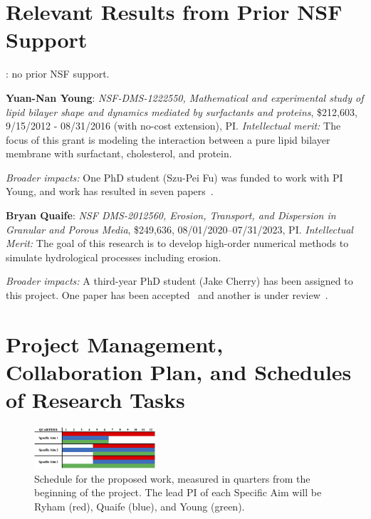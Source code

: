 \section{Relevant Results from Prior NSF Support}
\label{sec:prior}
: no prior NSF support.

\noindent
{\bf Yuan-Nan Young}: {\em NSF-DMS-1222550, Mathematical and
experimental study of lipid bilayer shape and dynamics mediated by
surfactants and proteins}, \$212,603, 9/15/2012 - 08/31/2016 (with
no-cost extension), PI. {\em Intellectual merit:} The focus of this
grant is modeling the interaction between a pure lipid bilayer membrane
with surfactant, cholesterol, and protein.

\noindent
{\em Broader impacts:} 
One PhD student (Szu-Pei Fu) was funded to work with PI Young, and work
has resulted in seven papers~\cite{Nganguia2013_PoF, Nganguia2013_PRE,
Young2014_JFM, Young2015_PoF, Nganguia2015_CiCP, Pak2015_PNAS,
fu2015pre}. 

\noindent
{\bf Bryan Quaife}: {\em NSF DMS-2012560, Erosion, Transport, and
Dispersion in Granular and Porous Media}, \$249,636,
08/01/2020--07/31/2023, PI. {\em Intellectual Merit:} The goal of this
research is to develop high-order numerical methods to
simulate hydrological processes including erosion.

\noindent
{\em Broader impacts:} 
A third-year PhD student (Jake Cherry) has been assigned to this
project. One paper has been accepted~\cite{che-lin-her-qua2022} and
another is under review~\cite{moo-che-chi-qua2022}.

\section{Project Management, Collaboration Plan, and Schedules of
Research Tasks}
\label{sec:manage}
\setlength{\parindent}{0pt}

\begin{figure}
  \vspace{-5pt}
  \includegraphics[width=0.4\textwidth]{figures/gantt.jpg}
  \vspace{-20pt}
  \caption{\label{fig:schedule} \footnotesize Schedule for the proposed
  work, measured in quarters from the beginning of the project. The lead
  PI of each Specific Aim will be Ryham (red), Quaife (blue), and Young
  (green).}
\end{figure}


